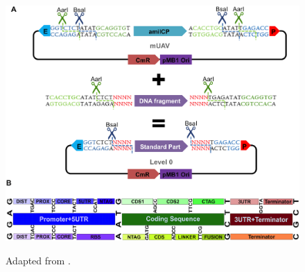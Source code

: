 \begin{figure}[!htbp]
    \centering
    \includegraphics[width=\textwidth]{images/chap4/chap4_mob_01.png}
    \label{fig:ch4mob01}
    \caption{Adapted from \parencite{Andreou2018}.}
\end{figure}
\FloatBarrier

